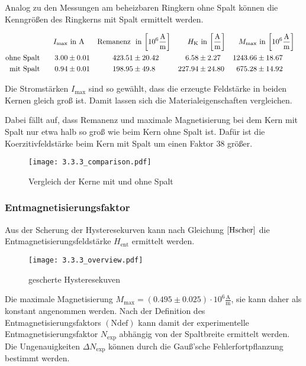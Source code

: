\documentclass[12pt,a4paper]{scrartcl}
\numberwithin{equation}{section} %
\renewcommand{\[}{} %
\renewcommand{\]}{\noindent} %
\begin{document}
Analog zu den Messungen am beheizbaren Ringkern ohne Spalt können die
Kenngrößen des Ringkerns mit Spalt ermittelt werden.

\[
\begin{align*}
    I_\mathrm{max} &\text{ in } \mathrm A &
        \text{Remanenz } &\text{ in }
            {\tiny \left[10^6 \frac{\mathrm A}{\mathrm m} \right] } &
        H_\mathrm{K} &\text{ in }
            {\tiny \left[ \frac{\mathrm A}{\mathrm m} \right] } &
        M_\mathrm{max} &\text{ in }
            {\tiny \left[10^6 \frac{\mathrm A}{\mathrm m} \right] }
        \\
    \text{ohne Spalt}\qquad
        3.00 &\pm 0.01 &
        423.51 &\pm 20.42 &
        6.58 &\pm 2.27 &
        1243.66 &\pm 18.67
        \\
    \text{mit Spalt}\qquad
        0.94 &\pm 0.01 &
        198.95 &\pm 49.8 &
        227.94 &\pm 24.80 &
        675.28 &\pm 14.92 &
\end{align*}
\]

Die Stromstärken \(I_\mathrm{max}\) sind so gewählt, dass die erzeugte
Feldstärke in beiden Kernen gleich groß ist. Damit lassen sich die
Materialeigenschaften vergleichen.

Dabei fällt auf, dass Remanenz und maximale Magnetisierung bei dem Kern
mit Spalt nur etwa halb so groß wie beim Kern ohne Spalt ist. Dafür ist
die Koerzitivfeldstärke beim Kern mit Spalt um einen Faktor \(38\)
größer.

\begin{figure}
\centering
\texttt{[image: 3.3.3\_comparison.pdf]}
\caption{Vergleich der Kerne mit und ohne Spalt}
\end{figure}

\hypertarget{entmagnetisierungsfaktor-2}{%
\subsubsection{Entmagnetisierungsfaktor}\label{entmagnetisierungsfaktor-2}}

Aus der Scherung der Hysteresekurven kann nach Gleichung
\(\eqref{Hscher}\) die Entmagnetisierungsfeldstärke \(H_\mathrm{ent}\)
ermittelt werden.

\begin{figure}
\centering
\texttt{[image: 3.3.3\_overview.pdf]}
\caption{gescherte Hysteresekuven}
\end{figure}

Die maximale Magnetisierung
\(M_\mathrm{max} = (0.495\pm 0.025) \cdot 10^6 \mathrm{\frac{A}{m}}\),
sie kann daher als konstant angenommen werden. Nach der Definition des
Entmagnetisierungsfaktors \((\mathrm{Ndef})\) kann damit der
experimentelle Entmagnetisierungsfaktor \(N_\mathrm{exp}\) abhängig von
der Spaltbreite ermittelt werden. Die Ungenauigkeiten
\(\Delta N_\mathrm{exp}\) können durch die Gauß'sche Fehlerfortpflanzung
bestimmt werden.
\end{document}
